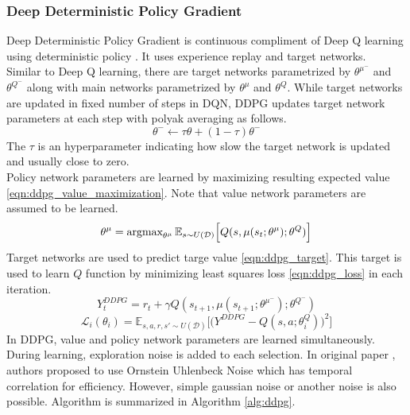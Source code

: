 \subsubsection{Deep Deterministic Policy Gradient}
Deep Deterministic Policy Gradient is continuous compliment of Deep Q learning using deterministic policy \cite{lillicrap_continuous_2019}. It uses experience replay and target networks. \\
Similar to Deep Q learning, there are target networks parametrized by $\theta^{\mu^-}$ and $\theta^{Q^-}$ along with main networks parametrized by $\theta^{\mu}$ and $\theta^{Q}$. While target networks are updated in fixed number of steps in DQN, DDPG updates target network parameters at each step with polyak averaging as follows. \\
\begin{equation}
\label{eqn:target_update}
\theta^- \leftarrow \tau \theta + (1-\tau) \theta^-
\end{equation}
The $\tau$ is an hyperparameter indicating how slow the target network is updated and usually close to zero. \\
Policy network parameters are learned by maximizing resulting expected value \ref{eqn:ddpg_value_maximization}. Note that value network parameters are assumed to be learned. \\
\begin{equation}
\label{eqn:ddpg_value_maximization}
\theta^\mu = \operatorname{\textup{argmax}}_{\theta^\mu} \mathbb{E}_{s \sim U(\mathcal{D})} \Big[ Q(s, \mu(s_t;\theta^\mu);\theta^Q) \Big]
\end{equation}
Target networks are used to predict targe value \eqref{eqn:ddpg_target}. This target is used to learn $Q$ function by minimizing least squares loss \eqref{eqn:ddpg_loss} in each iteration. \\
\begin{equation}
\label{eqn:ddpg_target}
Y_t^{DDPG} = r_t + \gamma Q(s_{t+1}, \mu(s_{t+1};\theta^{\mu^-});\theta^{Q^-})
\end{equation}
\begin{equation}
\label{eqn:ddpg_loss}
\mathcal{L}_i(\theta_i) = \mathbb{E}_{s,a,r,s'\sim U(\mathcal{D})}\Big[\big( Y^{DDPG} - Q(s,a;\theta^Q_i) \big) ^ 2 \Big]
\end{equation}
In DDPG, value and policy network parameters are learned simultaneously. During learning, exploration noise is added to each selection. In original paper \cite{lillicrap_continuous_2019}, authors proposed to use Ornstein Uhlenbeck Noise \cite{uhlenbeck_theory_1930} which has temporal correlation for efficiency. However, simple gaussian noise or another noise is also possible. Algorithm is summarized in Algorithm \ref{alg:ddpg}. \\
